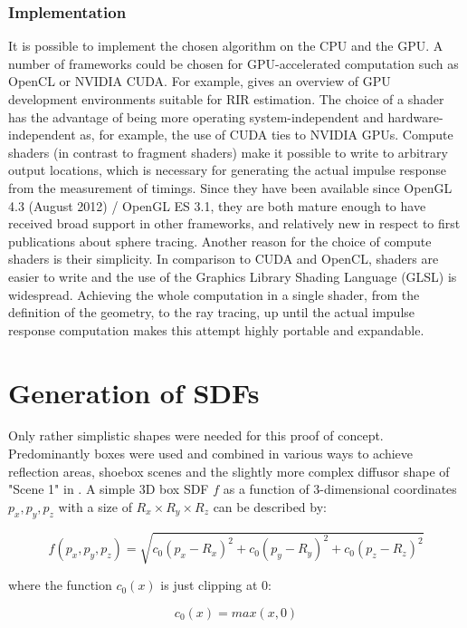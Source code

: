 \documentclass[twoside,a4paper]{article}
\begin{document}
\subsubsection{Implementation}
It is possible to implement the chosen algorithm on the CPU and the GPU. A number of frameworks could be chosen for GPU-accelerated computation such as OpenCL or NVIDIA CUDA. For example, \cite{stoltzfus_performance_2017} gives an overview of GPU development environments suitable for RIR estimation. The choice of a shader has the advantage of being more operating system-independent and hardware-independent as, for example, the use of CUDA ties to NVIDIA GPUs. Compute shaders (in contrast to fragment shaders) make it possible to write to arbitrary output locations, which is necessary for generating the actual impulse response from the measurement of timings. Since they have been available since OpenGL 4.3 (August 2012) / OpenGL ES 3.1, they are both mature enough to have received broad support in other frameworks, and relatively new in respect to first publications about sphere tracing. Another reason for the choice of compute shaders is their simplicity. In comparison to CUDA and OpenCL, shaders are easier to write and the use of the Graphics Library Shading Language (GLSL) is widespread. Achieving the whole computation in a single shader, from the definition of the geometry, to the ray tracing, up until the actual impulse response computation makes this attempt highly portable and expandable.

\section{Generation of SDFs}

Only rather simplistic shapes were needed for this proof of concept. Predominantly boxes were used and combined in various ways to achieve reflection areas, shoebox scenes and the slightly more complex diffusor shape of "Scene 1" in \cite{brinkmann_round_2019}. A simple 3D box SDF $f$ as a function of 3-dimensional coordinates $p_x, p_y, p_z$ with a size of $R_x\times R_y \times R_z$ can be described by:

\begin{equation}
  f(p_x, p_y, p_z) = \sqrt{c_0(p_x - R_x)^2 + c_0(p_y - R_y)^2 + c_0(p_z - R_z)^2}
  \label{eq:eq1}
\end{equation}

where the function $c_0(x)$ is just clipping at 0:

\begin{equation}
c_0(x) = max(x,0) 
\end{equation}
\end{document}
